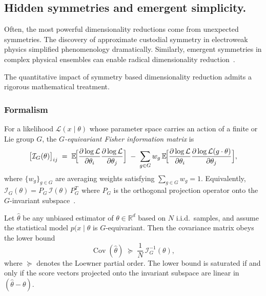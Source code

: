         \subsection{Hidden symmetries and emergent simplicity.}
            Often, the most powerful dimensionality reductions come from unexpected symmetries.
            The discovery of approximate custodial symmetry in electroweak physics simplified phenomenology dramatically.
            Similarly, emergent symmetries in complex physical ensembles can enable radical dimensionality reduction~\cite{schmalian_emergent_2008}.

            The quantitative impact of symmetry based dimensionality reduction admits a rigorous mathematical treatment.
            \subsubsection{Formalism}
            \begin{definition}
                For a likelihood \(\mathcal L(x\mid\theta)\) whose parameter space carries an action of a finite or Lie group \(G\), the \emph{\(G\)-equivariant Fisher information matrix} is  
                \[
                  \bigl[\mathcal I_G(\theta)\bigr]_{ij}
                  \;=\;
                  \mathbb E\!\Bigl[
                      \frac{\partial\log \mathcal L}{\partial\theta_i}
                      \frac{\partial\log \mathcal L}{\partial\theta_j}
                  \Bigr]
                  \;-\;
                  \sum_{g\in G} w_g\,
                  \mathbb E\!\Bigl[
                      \frac{\partial\log \mathcal L}{\partial\theta_i}
                      \frac{\partial\log \mathcal L(g \cdot \theta)}{\partial\theta_j}
                  \Bigr],
                \]
                where \(\{w_g\}_{g\in G}\) are averaging weights satisfying \(\sum_{g\in G}w_g=1\).  Equivalently,  
                \(\mathcal I_G(\theta)=P_G\,\mathcal I(\theta)\,P_G^{T}\) where \(P_G\) is the orthogonal projection operator onto the \(G\)-invariant subspace~\cite{nielsen_elementary_2020}.
\end{definition}
\begin{theorem}
    Let \(\hat\theta\) be any unbiased estimator of \(\theta\in\mathbb R^d\) based on \(N\) i.i.d.\ samples, and assume the statistical model \(p(x\mid\theta\) is \(G\)-equivariant.
Then the covariance matrix obeys the lower bound
\[
  \operatorname{Cov}(\hat\theta)
  \;\succeq\;
  \frac{1}{N}\,\mathcal I_G^{-1}(\theta),
\]
where \(\succeq\) denotes the Loewner partial order.  The lower bound is saturated if and only if the score vectors projected onto the invariant subspace are linear in \((\hat\theta-\theta)\).
\end{theorem}

